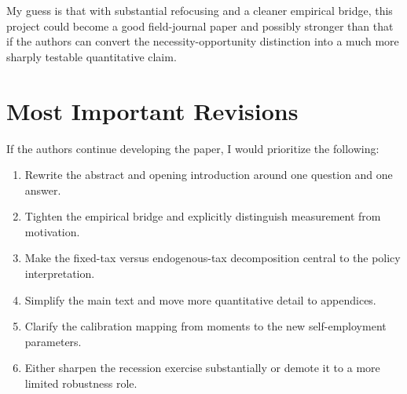 \documentclass[11pt]{article}
\begin{document}
My guess is that with substantial refocusing and a cleaner empirical bridge,
this project could become a good field-journal paper and possibly stronger than
that if the authors can convert the necessity-opportunity distinction into a
much more sharply testable quantitative claim.

\section*{Most Important Revisions}

If the authors continue developing the paper, I would prioritize the following:

\begin{enumerate}[leftmargin=*]
\item Rewrite the abstract and opening introduction around one question and one
answer.
\item Tighten the empirical bridge and explicitly distinguish measurement from
motivation.
\item Make the fixed-tax versus endogenous-tax decomposition central to the
policy interpretation.
\item Simplify the main text and move more quantitative detail to appendices.
\item Clarify the calibration mapping from moments to the new self-employment
parameters.
\item Either sharpen the recession exercise substantially or demote it to a more
limited robustness role.
\end{enumerate}
\end{document}

